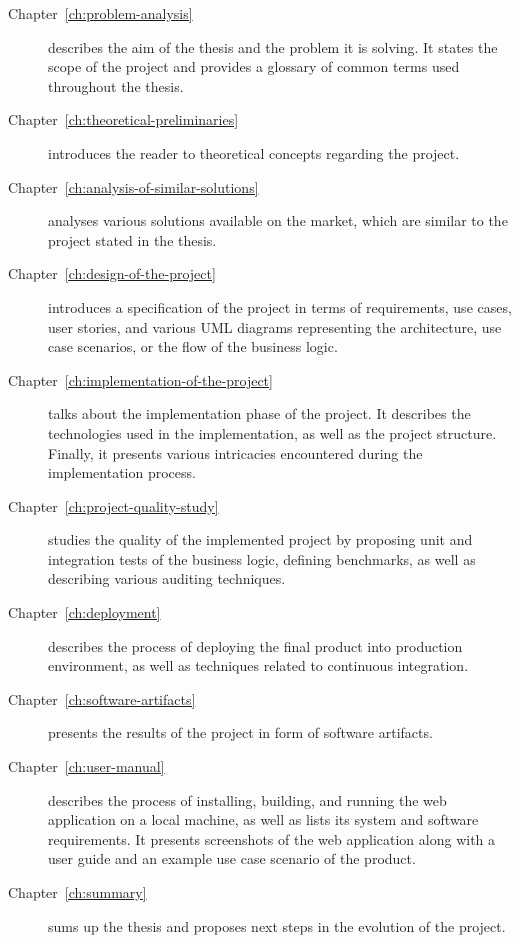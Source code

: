 \documentclass[english,bachelors,forcepolishlogotype]{wizthesis}
\begin{document}
\begin{description}
  \item[Chapter~\ref{ch:problem-analysis}] describes the aim of the thesis and
  the problem it is solving. It states the scope of the project and provides a
  glossary of common terms used throughout the thesis.
  \item[Chapter~\ref{ch:theoretical-preliminaries}] introduces the reader to
  theoretical concepts regarding the project.
  \item[Chapter~\ref{ch:analysis-of-similar-solutions}] analyses various
  solutions available on the market, which are similar to the project stated in
  the thesis.
  \item[Chapter~\ref{ch:design-of-the-project}] introduces a specification of
  the project in terms of requirements, use cases, user stories, and various UML
  diagrams representing the architecture, use case scenarios, or the flow of the
  business logic.
  \item[Chapter~\ref{ch:implementation-of-the-project}] talks about the
  implementation phase of the project. It describes the technologies used in the
  implementation, as well as the project structure. Finally, it presents various
  intricacies encountered during the implementation process.
  \item[Chapter~\ref{ch:project-quality-study}] studies the quality of the
  implemented project by proposing unit and integration tests of the business
  logic, defining benchmarks, as well as describing various auditing techniques.
  \item[Chapter~\ref{ch:deployment}] describes the process of deploying the
  final product into production environment, as well as techniques related to
  continuous integration.
  \item[Chapter~\ref{ch:software-artifacts}] presents the results of the project
  in form of software artifacts.
  \item[Chapter~\ref{ch:user-manual}] describes the process of installing,
  building, and running the web application on a local machine, as well as lists
  its system and software requirements. It presents screenshots of the web
  application along with a user guide and an example use case scenario of the
  product.
  \item[Chapter~\ref{ch:summary}] sums up the thesis and proposes next steps
  in the evolution of the project.
\end{description}

\mainmatter %
\end{document}
